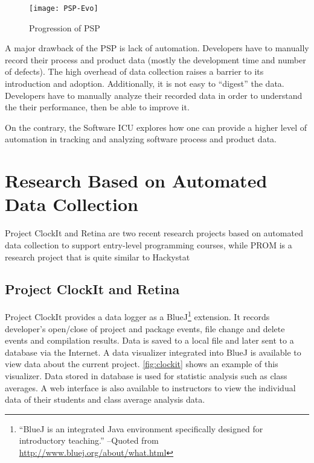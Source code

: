 \begin{figure}[htbp] %
   \centering
   \texttt{[image: PSP-Evo]} 
   \caption{Progression of PSP}
   \label{fig:PSP-Evo}
\end{figure}


A major drawback of the PSP is lack of automation. Developers have to manually record their process and product data (mostly the development time and number of defects). The high overhead of data collection raises a barrier to its introduction and adoption. Additionally, it is not easy to ``digest'' the data. Developers have to manually analyze their recorded data in order to understand the their performance, then be able to improve it.

On the contrary, the Software ICU explores how one can provide a higher level of automation in tracking and analyzing software process and product data.


\section {Research Based on Automated Data Collection}
Project ClockIt and Retina are two recent research projects based on automated data collection to support entry-level programming courses, while PROM is a research project that is quite similar to Hackystat

\subsection {Project ClockIt and Retina}
Project ClockIt provides a data logger as a BlueJ\footnote{``BlueJ is an integrated Java environment specifically designed for introductory teaching.'' --Quoted from \url{http://www.bluej.org/about/what.html}} extension. It records developer's open/close of project and package events, file change and delete events and compilation results. Data is saved to a local file and later sent to a database via the Internet. A data visualizer integrated into BlueJ is available to view data about the current project. \autoref{fig:clockit} shows an example of this visualizer. Data stored in database is used for statistic analysis such as class averages. A web interface is also available to instructors to view the individual data of their students and class average analysis data.

